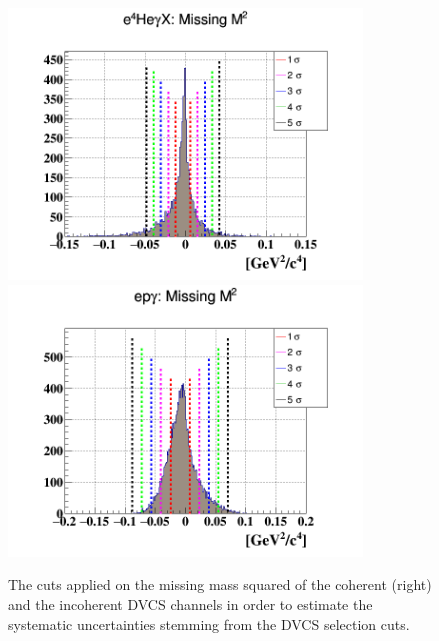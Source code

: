 \begin{figure}[tbp]
\hspace{-1.0cm}
   \includegraphics[height=7.2cm]{fig/e4Hegamma_M2_Mis_sig.png}
   \includegraphics[height=7.2cm]{fig/epgamma_M2_Mis_sig.png}
   \caption{The cuts applied on the missing mass squared of the coherent 
(right) and the incoherent DVCS channels in order to estimate the systematic 
uncertainties stemming from the DVCS selection cuts. }
\label{fig:MM2_sys_cuts}
\end{figure}



